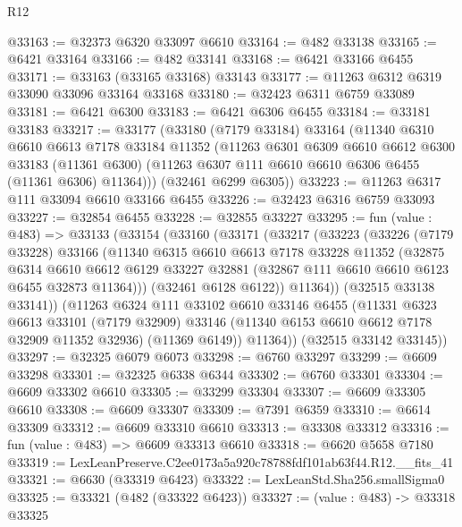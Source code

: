 \begin{lexlean}{R12}
\begin{coremodule}
@33163 := @32373 @6320 @33097 @6610
@33164 := @482 @33138
@33165 := @6421 @33164
@33166 := @482 @33141
@33168 := @6421 @33166 @6455
@33171 := @33163 (@33165 @33168) @33143
@33177 := @11263 @6312 @6319 @33090 @33096 @33164 @33168
@33180 := @32423 @6311 @6759 @33089
@33181 := @6421 @6300
@33183 := @6421 @6306 @6455
@33184 := @33181 @33183
@33217 := @33177
    (@33180
      (@7179 @33184)
      @33164
      (@11340
        @6310
        @6610
        @6613
        @7178
        @33184
        @11352
        (@11263
          @6301
          @6309
          @6610
          @6612
          @6300
          @33183
          (@11361 @6300)
          (@11263 @6307 @111 @6610 @6610 @6306 @6455 (@11361 @6306) @11364)))
      (@32461 @6299 @6305))
@33223 := @11263 @6317 @111 @33094 @6610 @33166 @6455
@33226 := @32423 @6316 @6759 @33093
@33227 := @32854 @6455
@33228 := @32855 @33227
@33295 := fun (value : @483) =>
  @33133
    (@33154
      (@33160
        (@33171
          (@33217
            (@33223
              (@33226
                (@7179 @33228)
                @33166
                (@11340
                  @6315
                  @6610
                  @6613
                  @7178
                  @33228
                  @11352
                  (@32875
                    @6314
                    @6610
                    @6612
                    @6129
                    @33227
                    @32881
                    (@32867 @111 @6610 @6610 @6123 @6455 @32873 @11364)))
                (@32461 @6128 @6122))
              @11364))
          (@32515 @33138 @33141))
        (@11263
          @6324
          @111
          @33102
          @6610
          @33146
          @6455
          (@11331
            @6323
            @6613
            @33101
            (@7179 @32909)
            @33146
            (@11340 @6153 @6610 @6612 @7178 @32909 @11352 @32936)
            (@11369 @6149))
          @11364))
      (@32515 @33142 @33145))
@33297 := @32325 @6079 @6073
@33298 := @6760 @33297
@33299 := @6609 @33298
@33301 := @32325 @6338 @6344
@33302 := @6760 @33301
@33304 := @6609 @33302 @6610
@33305 := @33299 @33304
@33307 := @6609 @33305 @6610
@33308 := @6609 @33307
@33309 := @7391 @6359
@33310 := @6614 @33309
@33312 := @6609 @33310 @6610
@33313 := @33308 @33312
@33316 := fun (value : @483) => @6609 @33313 @6610
@33318 := @6620 @5658 @7180
@33319 := LexLeanPreserve.C2ee0173a5a920c78788fdf101ab63f44.R12.__fits_41
@33321 := @6630 (@33319 @6423)
@33322 := LexLeanStd.Sha256.smallSigma0
@33325 := @33321 (@482 (@33322 @6423))
@33327 := (value : @483) -> @33318 @33325

\end{coremodule}
\end{lexlean}
